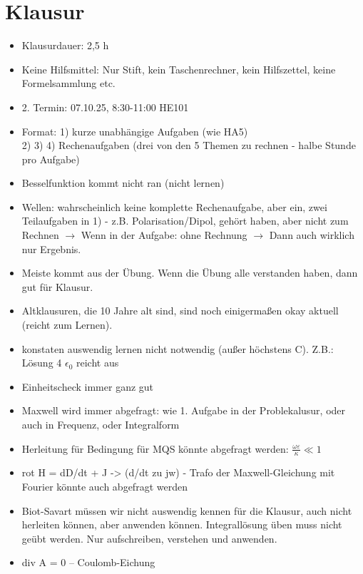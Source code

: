 \section{Klausur}

\begin{itemize}
\item Klausurdauer: 2,5 h
\item Keine Hilfsmittel: Nur Stift, kein Taschenrechner, kein Hilfszettel, keine Formelsammlung etc.
\item 2. Termin: 07.10.25, 8:30-11:00 HE101
\item Format: 1) kurze unabhängige Aufgaben (wie HA5)\\
2) 3) 4) Rechenaufgaben (drei von den 5 Themen zu rechnen - halbe Stunde pro Aufgabe)
\item Besselfunktion kommt nicht ran (nicht lernen)
\item Wellen: wahrscheinlich keine komplette Rechenaufgabe, aber ein, zwei Teilaufgaben in 1) - z.B. Polarisation/Dipol, gehört haben, aber nicht zum Rechnen $\rightarrow$ Wenn in der Aufgabe: ohne Rechnung $\rightarrow$ Dann auch wirklich nur Ergebnis.
\item Meiste kommt aus der Übung. Wenn die Übung alle verstanden haben, dann gut für Klausur.
\item Altklausuren, die 10 Jahre alt sind, sind noch einigermaßen okay aktuell (reicht zum Lernen).
\item konstaten auswendig lernen nicht notwendig (außer höchstens C). Z.B.: Lösung 4 $\epsilon_0$ reicht aus
\item Einheitscheck immer ganz gut
\item Maxwell wird immer abgefragt: wie 1. Aufgabe in der Problekalusur, oder auch in Frequenz, oder Integralform
\item Herleitung für Bedingung für MQS könnte abgefragt werden: $\frac{\omega \varepsilon}{\kappa} \ll 1$
\item rot H = dD/dt + J -> (d/dt zu jw)  - Trafo der Maxwell-Gleichung mit Fourier könnte auch abgefragt werden
\item Biot-Savart müssen wir nicht auswendig kennen für die Klausur, auch nicht herleiten können, aber anwenden können. Integrallösung üben muss nicht geübt werden. Nur aufschreiben, verstehen und anwenden.
\item div A = 0 -- Coulomb-Eichung


\end{itemize}